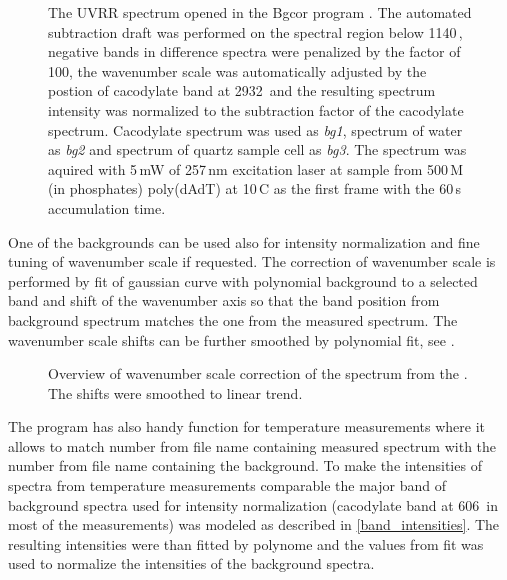 \begin{figure}
	\centering
	\caption[%
		Bgcor -- program for background correction.
	]{%
		The UVRR spectrum opened in the Bgcor program
		\parencite{Bgcor2017}.
		The automated subtraction draft was performed on the spectral region below
		1140\,\icm{}, negative bands in difference spectra were penalized by the
		factor of 100, the wavenumber scale was automatically adjusted by the
		postion of cacodylate band at 2932\,\icm{} and the resulting spectrum
		intensity was normalized to the subtraction factor of the cacodylate
		spectrum.
		Cacodylate spectrum was used as \emph{bg1}, spectrum of water as \emph{bg2}
		and spectrum of quartz sample cell as \emph{bg3}.
		The spectrum was aquired with 5\,mW of 257\,nm excitation laser at sample
		from 500\,M (in phosphates) poly(dAdT) at 10\,\textdegree{}C as the
		first frame with the 60\,s accumulation time.
	}
	\label{\figlabel{background:bgcor_main}}
\end{figure}

One of the backgrounds can be used also for intensity normalization and
fine tuning of wavenumber scale if requested.
The correction of wavenumber scale is performed by fit of gaussian curve with
polynomial background to a selected band and shift of the wavenumber axis so
that the band position from background spectrum matches the one from the
measured spectrum.
The wavenumber scale shifts can be further smoothed by polynomial fit, see
.

\begin{figure}
	\centering
	\caption[%
		Bgcor -- wavenumber scale correction.
	]{%
		Overview of wavenumber scale correction of the spectrum from the
		.
		The shifts were smoothed to linear trend.
	}
	\label{\figlabel{background:bgcor_xshift}}
\end{figure}

The program has also handy function for temperature measurements where it
allows to match number from file name containing measured spectrum with
the number from file name containing the background.
To make the intensities of spectra from temperature measurements comparable
the major band of background spectra used for intensity normalization
(cacodylate band at 606\,\icm{} in most of the measurements) was modeled as
described in
\cref{band_intensities}.
The resulting intensities were than fitted by polynome and the values from fit
was used to normalize the intensities of the background spectra.

